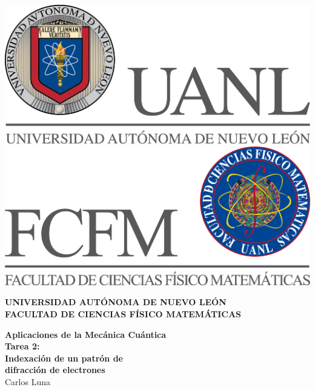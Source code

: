 \documentclass[reprint,amsmath,amssymb,aps,]{revtex4-2}
\begin{document}
\begin{abstract}
\lipsum[1]
\end{abstract}
\begin{titlepage}
\begin{center}
\includegraphics[scale=0.40]{../../../Logos/uanl.png} 
\hspace{2.5cm}
\includegraphics[scale=0.40]{../../../Logos/fcfm.png}
\end{center}
\vspace{2cm}
\begin{center}
\textbf{
UNIVERSIDAD AUTÓNOMA DE NUEVO LEÓN\\
FACULTAD DE CIENCIAS
FÍSICO MATEMÁTICAS}\\
\vspace*{2cm}
\begin{large}
\vspace{1cm}
\large{\textbf{Aplicaciones de la Mecánica Cuántica}}\vspace{1.5cm}\\
\textbf{Tarea 2:\\ Indexación de un patrón de \\difracción de electrones}\\
Carlos Luna\\
\end{large}
\vspace{3.5cm}

\end{center}
\end{titlepage}
\end{document}
